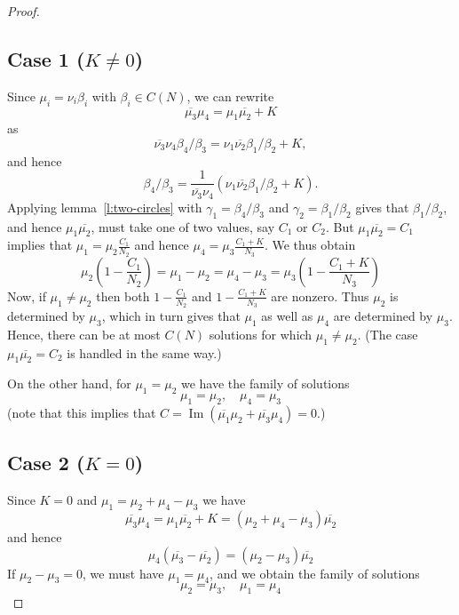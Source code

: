 \documentclass[12pt]{amsart}
\theoremstyle{plain}
\newcommand{\torus}{C(N)} %
\newcommand{\im}{\operatorname{Im}}
\renewcommand{\^}{\widehat}
\begin{document}
\begin{proof}
\subsection*{Case 1 ($K \neq 0$)}
%
Since $\mu_i = \nu_i \beta_i$ with $\beta_i \in \torus$, we can rewrite 
$$
\overline{\mu_3} \mu_4
=
\mu_1 \overline{\mu_2}
+K
$$
as
$$
\overline{\nu_3} \nu_4  \beta_4/\beta_3
=
\nu_1 \overline{\nu_2} \beta_1/\beta_2
+K,
$$
and hence
$$
\beta_4/\beta_3
=
\frac{1}{\overline{\nu_3} \nu_4} 
( \nu_1 \overline{\nu_2} \beta_1/\beta_2+K).
$$
%
Applying lemma~\ref{l:two-circles} with $\gamma_1=\beta_4/\beta_3$ and
$\gamma_2=\beta_1/\beta_2$ gives that $\beta_1/\beta_2$, and hence
$\mu_1 \overline{\mu_2}$, must take one of two values, say $C_1$ or
$C_2$.
%
But $\mu_1 \overline{\mu_2} = C_1$ implies that 
$\mu_1 =  \mu_2 \frac{C_1}{N_2}$ and hence
$\mu_4 = \mu_3 \frac{C_1+K}{N_3} $.  We thus obtain
$$
\mu_2(1- \frac{C_1}{N_2}) = 
\mu_1-\mu_2=
\mu_4-\mu_3=
\mu_3(1- \frac{C_1+K}{N_3})
$$
Now, if $\mu_1 \neq \mu_2$ then both $1- \frac{C_1}{N_2}$ and $1-
\frac{C_1+K}{N_3}$ are nonzero.  Thus $\mu_2$ is determined by
$\mu_3$, which in turn gives that $\mu_1$ as well as $\mu_4$ are
determined by $\mu_3$.  Hence, there can be at most $\torus$ solutions
for which $\mu_1 \neq \mu_2$.  (The case $\mu_1 \overline{\mu_2} =
C_2$ is handled in the same way.)

On the other hand, for $\mu_1 = \mu_2$ we have the family of
solutions 
\begin{equation}
  \label{eq:diag-sol-two}
\mu_1 =\mu_2, \quad \mu_4=\mu_3
\end{equation}
(note that this implies that $C = 
\im(\overline{\mu_1} \mu_2+ \overline{\mu_3}\mu_4) = 0$.)

\subsection*{Case 2 ($K = 0$)}
%


Since $K=0$ and $\mu_1  = \mu_2 + \mu_4 - \mu_3$
we have
$$
\overline{\mu_3} \mu_4
=
\mu_1 \overline{\mu_2} + K
=
(\mu_2 + \mu_4 - \mu_3) \overline{\mu_2}
$$
and hence
$$
\mu_4 (\overline{\mu_3} -\overline{\mu_2})
=
(\mu_2  - \mu_3) \overline{\mu_2}
$$
If $\mu_2 - \mu_3 = 0$, we must have $\mu_1=\mu_4$, and we obtain
the family of solutions 
\begin{equation}
\label{eq:diag-sol-one}
\mu_2 = \mu_3,  \quad
\mu_1=\mu_4
\end{equation}


\end{proof}
\end{document}

